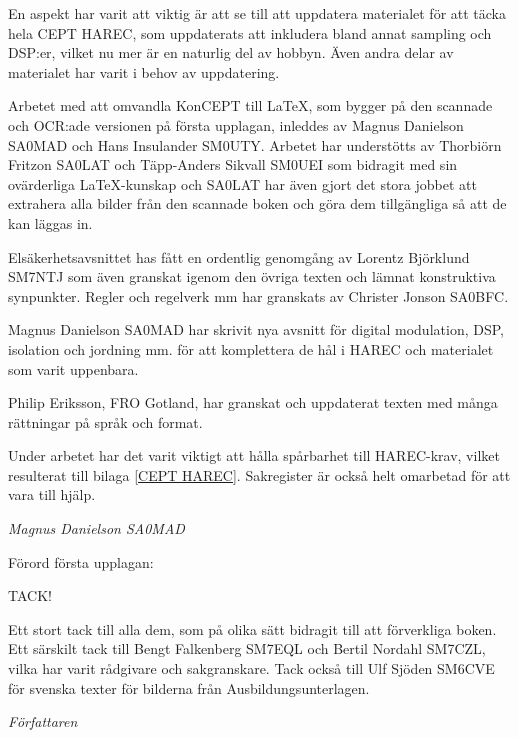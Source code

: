 En aspekt har varit att viktig är att se till att uppdatera materialet för
att täcka hela CEPT HAREC, som uppdaterats att inkludera bland annat sampling
och DSP:er, vilket nu mer är en naturlig del av hobbyn. Även andra delar av
materialet har varit i behov av uppdatering.

Arbetet med att omvandla KonCEPT till \LaTeX, som bygger på den scannade och
OCR:ade versionen på första upplagan, inleddes av Magnus Danielson SA0MAD och
Hans Insulander SM0UTY. Arbetet har understötts av Thorbiörn Fritzon SA0LAT och
Täpp-Anders Sikvall SM0UEI som bidragit med sin ovärderliga \LaTeX -kunskap och
SA0LAT har även gjort det stora jobbet att extrahera alla bilder från den
scannade boken och göra dem tillgängliga så att de kan läggas in.

Elsäkerhetsavsnittet has fått en ordentlig genomgång av Lorentz Björklund SM7NTJ
som även granskat igenom den övriga texten och lämnat konstruktiva synpunkter.
Regler och regelverk mm har granskats av Christer Jonson SA0BFC.

Magnus Danielson SA0MAD har skrivit nya avsnitt för digital modulation, DSP,
isolation och jordning mm. för att komplettera de hål i HAREC och materialet
som varit uppenbara.

Philip Eriksson, FRO Gotland, har granskat och uppdaterat texten med många
rättningar på språk och format.

Under arbetet har det varit viktigt att hålla spårbarhet till HAREC-krav,
vilket resulterat till bilaga \ref{CEPT HAREC}.
Sakregister är också helt omarbetad för att vara till hjälp.

\emph{Magnus Danielson SA0MAD}


Förord första upplagan:

TACK!

Ett stort tack till alla dem, som på olika sätt bidragit till att förverkliga
boken. Ett särskilt tack till Bengt Falkenberg SM7EQL och Bertil Nordahl SM7CZL,
vilka har varit rådgivare och sakgranskare. Tack också till Ulf Sjöden SM6CVE
för svenska texter för bilderna från Ausbildungsunterlagen.

\emph{Författaren}
